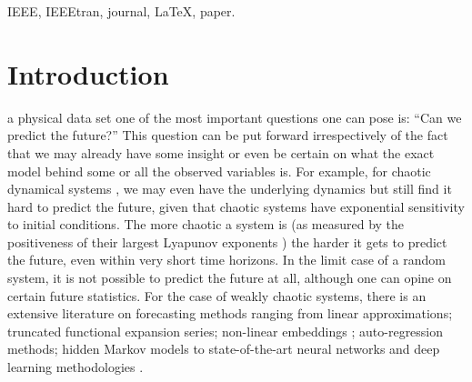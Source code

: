 \documentclass[journal]{IEEEtran}
\begin{document}
\begin{IEEEkeywords}
IEEE, IEEEtran, journal, \LaTeX, paper.
\end{IEEEkeywords}






%
\IEEEpeerreviewmaketitle



\section{Introduction}
%
%
%
%
 a physical data set one of the most important questions one can pose is: ``Can we predict the future?'' This 
question can be put forward irrespectively of the fact that we may already have some insight or even be certain on what the exact model 
behind some or all the observed variables is. For example, for chaotic dynamical systems \cite{0813340853,2004icti.book.....M}, we may 
even have the underlying dynamics but still find it hard to predict the future, given that chaotic systems have exponential sensitivity 
to initial conditions. The more chaotic a system is (as measured by the positiveness of their largest Lyapunov exponents 
\cite{1985PhyD...16..285W,1994PhLA..185...77K}) the harder it gets to predict the future, even within very short time horizons. In the 
limit case of a random system, it is not possible to predict the future at all, although one can opine on certain future 
statistics\cite{9780486693873}. For the case of weakly chaotic systems, there is an extensive literature on forecasting methods ranging 
from linear approximations\cite{1451722}; truncated functional expansion 
series\cite{Powell:1987:RBF:48424.48433,Broomhead1988MultivariableFI}; non-linear embeddings \cite{PhysRevLett.59.845}; auto-regression 
methods\cite{0130607746}; hidden Markov models \cite{1165342} to state-of-the-art neural networks and deep learning methodologies 
\cite{LANGKVIST201411}.
\end{document}
